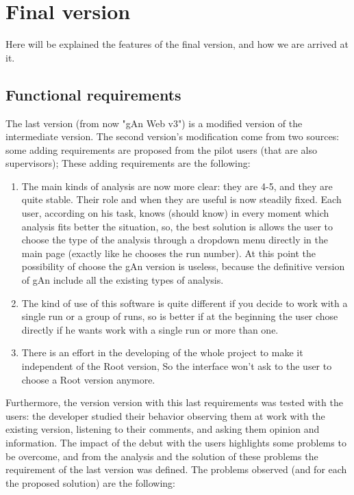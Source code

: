 
\chapter{Final version} %

\label{Chapter5} %

Here will be explained the features of the final version, and how we are arrived at it.

\section{Functional requirements}

The last version (from now "gAn Web v3") is a modified version of the intermediate version. 
The second version's modification come from two sources: some adding requirements are proposed from the pilot users (that are also supervisors); These adding requirements are the following:

\begin{enumerate}
\item 
The main kinds of analysis are now more clear: they are 4-5, and they are     quite stable. Their role and when they are useful is now steadily fixed. Each user, according on his task, knows (should know) in every moment which analysis fits better the situation, so, the best solution is allows the user to choose the type of the analysis through a dropdown menu directly in the main page (exactly like he chooses the run number). At this point the possibility of choose the gAn version is useless, because the definitive version of gAn include all the existing types of analysis. 

\item 
The kind of use of this software is quite different if you decide to work with a single run or a group of runs, so is better if at the beginning the user chose directly if he wants work with a single run or more than one. 

\item
There is an effort in the developing of the whole project to make it independent of the Root version, So the interface won't ask to the user to choose a Root version anymore.

\end{enumerate}
 
Furthermore, the version version with this last requirements was tested with the users: the developer studied their behavior observing them at work with the existing version, listening to their comments, and asking them opinion and information. The impact  of the debut with the users highlights some problems to be overcome, and from the analysis and the solution of these problems the requirement of the last version was defined. The problems observed (and for each the proposed solution) are the following:

